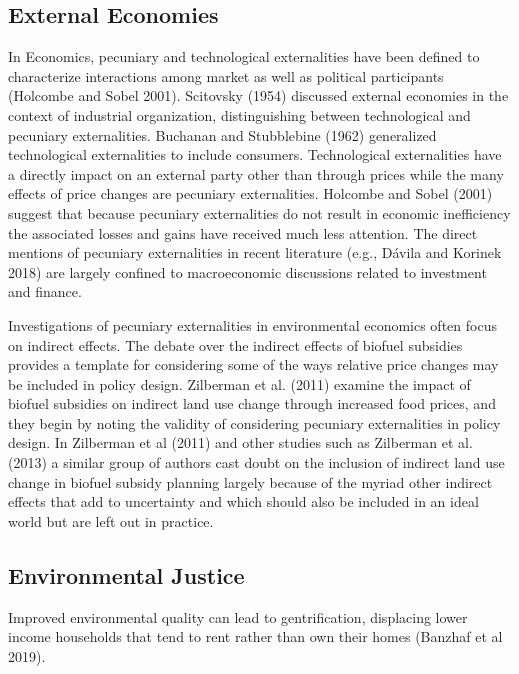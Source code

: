 \documentclass[ecta,nameyear,draft]{econsocart}
\theoremstyle{plain}
\theoremstyle{remark}
\begin{document}
\subsection{External Economies} 

In Economics, pecuniary and technological externalities have been defined to characterize interactions among market as well as political participants (Holcombe and Sobel 2001). Scitovsky (1954) discussed external economies in the context of industrial organization, distinguishing between technological and pecuniary externalities. Buchanan and Stubblebine (1962) generalized technological externalities to include consumers. Technological externalities have a directly impact on an external party other than through prices while the many effects of price changes are pecuniary externalities. Holcombe and Sobel (2001) suggest that because pecuniary externalities do not result in economic inefficiency the associated losses and gains have received much less attention. The direct mentions of pecuniary externalities in recent literature (e.g., Dávila and Korinek 2018) are largely confined to macroeconomic discussions related to investment and finance. 

Investigations of pecuniary externalities in environmental economics often focus on indirect effects. The debate over the indirect effects of biofuel subsidies provides a template for considering some of the ways relative price changes may be included in policy design. Zilberman et al. (2011) examine the impact of biofuel subsidies on indirect land use change through increased food prices, and they begin by noting the validity of considering pecuniary externalities in policy design. In Zilberman et al (2011) and other studies such as Zilberman et al. (2013) a similar group of authors cast doubt on the inclusion of indirect land use change in biofuel subsidy planning largely because of the myriad other indirect effects that add to uncertainty and which should also be included in an ideal world but are left out in practice. 





\subsection{Environmental Justice} 

Improved environmental quality can lead to gentrification, displacing lower income households that tend to rent rather than own their homes (Banzhaf et al 2019). 	 
\end{document}
